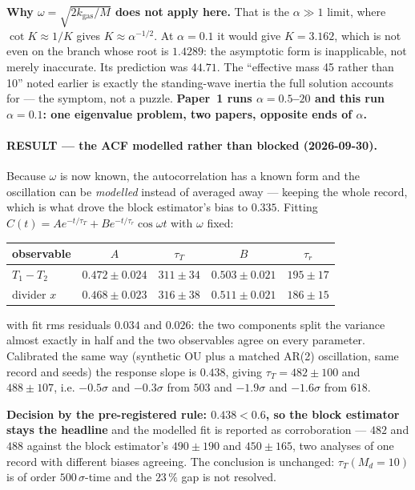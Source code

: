 \documentclass[11pt,a4paper]{article}
\begin{document}
\textbf{Why $\omega = \sqrt{2k_{\mathrm{gas}}/M}$ does not apply here.} That is the $\alpha \gg 1$
limit, where $\cot K \approx 1/K$ gives $K \approx \alpha^{-1/2}$. At $\alpha = 0.1$ it would give
$K = 3.162$, which is not even on the branch whose root is $1.4289$: the asymptotic form is
inapplicable, not merely inaccurate. Its prediction was $44.71$. The ``effective mass 45 rather than
10'' noted earlier is exactly the standing-wave inertia the full solution accounts for --- the
symptom, not a puzzle. \textbf{Paper~1 runs $\alpha = 0.5$--$20$ and this run $\alpha = 0.1$: one
eigenvalue problem, two papers, opposite ends of $\alpha$.}

\paragraph{RESULT --- the ACF modelled rather than blocked (2026-09-30).} Because $\omega$ is now
known, the autocorrelation has a known form and the oscillation can be \emph{modelled} instead of
averaged away --- keeping the whole record, which is what drove the block estimator's bias to
$0.335$. Fitting $C(t) = A e^{-t/\tau_T} + B e^{-t/\tau_r}\cos\omega t$ with $\omega$ fixed:
\begin{center}
\begin{tabular}{lcccc}
\toprule
observable & $A$ & $\tau_T$ & $B$ & $\tau_r$ \\
\midrule
$T_1-T_2$   & $0.472 \pm 0.024$ & $311 \pm 34$ & $0.503 \pm 0.021$ & $195 \pm 17$ \\
divider $x$ & $0.468 \pm 0.023$ & $316 \pm 38$ & $0.511 \pm 0.021$ & $186 \pm 15$ \\
\bottomrule
\end{tabular}
\end{center}
with fit rms residuals $0.034$ and $0.026$: the two components split the variance almost exactly in
half and the two observables agree on every parameter. Calibrated the same way (synthetic OU plus a
matched AR(2) oscillation, same record and seeds) the response slope is $0.438$, giving
$\tau_T = 482 \pm 100$ and $488 \pm 107$, i.e. $-0.5\sigma$ and $-0.3\sigma$ from $503$ and
$-1.9\sigma$ and $-1.6\sigma$ from $618$.

\textbf{Decision by the pre-registered rule: $0.438 < 0.6$, so the block estimator stays the
headline} and the modelled fit is reported as corroboration --- $482$ and $488$ against the block
estimator's $490 \pm 190$ and $450 \pm 165$, two analyses of one record with different biases
agreeing. The conclusion is unchanged: $\tau_T(M_d=10)$ is of order $500\,\sigma$-time and the
$23\,\%$ gap is not resolved.
\end{document}
